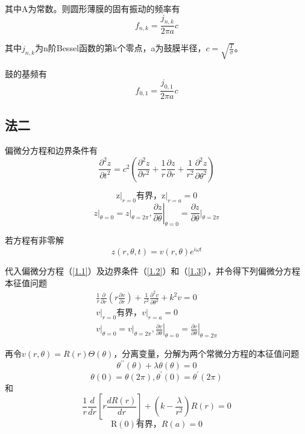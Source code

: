 其中A为常数。则圆形薄膜的固有振动的频率有
$$f_{n, k}=\frac{j_{n, k}}{2 \pi a}c$$

其中$j_{n,k}$为n阶Bessel函数的第k个零点，a为鼓膜半径，$c=\sqrt{\frac{T}{\sigma}}$。

鼓的基频有
$$f_{0, 1}=\frac{j_{0, 1}}{2 \pi a}c$$

\subsection{法二}
偏微分方程和边界条件有
\begin{equation}
	\frac{\partial^2 z}{\partial t^2}=c^2 \left(\frac{\partial^2 z}{\partial r^2}+\frac{1}{r}\frac{\partial z}{\partial r}+\frac{1}{r^2} \frac{\partial^2 z}{\partial\theta^2}\right)
	\label{1.1}
	\tag{1.1}
\end{equation}

\begin{equation}
	\left .\mathrm{z}\right |_{r=0}\text{有界，}\left .\mathrm{z}\right |_{r=a}=0
	\label{1.2}
	\tag{1.2}
\end{equation}
\begin{equation}
	\left .z\right |_{\theta=0}=\left .z\right |_{\theta=2 \pi},\left .\frac{\partial z}{\partial \theta}\right |_{\theta=0}=\frac{\partial z}{\partial \theta} |_{\theta=2 \pi}
	\label{1.3}
	\tag{1.3}
\end{equation}

若方程有非零解
\begin{equation}
	z(r, \theta, t)=v(r, \theta) e^{i \omega t}
	\label{2}
	\tag{2}
\end{equation}

代入偏微分方程（\ref{1.1}）及边界条件（\ref{1.2}）和（\ref{1.3}），并令得下列偏微分方程本征值问题
\[
\begin{array}{c}
	\frac{1}{r} \frac{\partial}{\partial r}\left(r \frac{\partial v}{\partial r}\right)+\frac{1}{r^2} \frac{\partial^2 v}{\partial \theta^2}+k^2 v=0\\
	\left .v\right |_{r=0}\text{有界，}\left .v\right |_{r=a}=0\\
	\left .v\right |_{\theta=0}=\left .v\right |_{\theta=2 \pi},\left .\frac{\partial v}{\partial \theta}\right |_{\theta=0}=\left .\frac{\partial v}{\partial \theta}\right |_{\theta=2 \pi}
\end{array}
\]

再令$v(r,\theta)=R(r)\Theta(\theta)$，分离变量，分解为两个常微分方程的本征值问题
\begin{equation}
	\theta^{\prime \prime}(\theta)+\lambda \theta(\theta)=0 
	\label{3.1}
	\tag{3.1}
\end{equation}
\begin{equation}
	\theta(0)=\theta(2 \pi), \theta^{\prime}(0)=\theta^{\prime}(2 \pi)
	\label{3.2}
	\tag{3.2}
\end{equation}
和
\begin{equation}
	\frac{1}{r} \frac{d}{d r}\left[r \frac{d R(r)}{d r}\right]+\left(k-\frac{\lambda}{r^2}\right) R(r)=0
	\label{4.1}
	\tag{4.1}
\end{equation}
\begin{equation}
	\mathrm{R}(0)\text{有界，}R(a)=0
	\label{4.2}
	\tag{4.2}
\end{equation}

